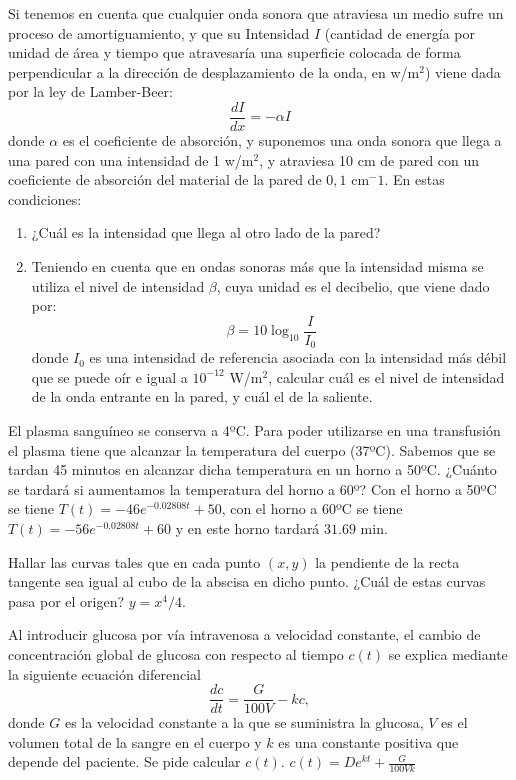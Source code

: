 {Si tenemos en cuenta que cualquier onda sonora que atraviesa un medio sufre un proceso de amortiguamiento, y que su
Intensidad $I$ (cantidad de energía por unidad de área y tiempo que atravesaría una superficie colocada de forma
perpendicular a la dirección de desplazamiento de la onda, en w/m$^2$) viene dada por la ley de Lamber-Beer:
\[
\frac{{dI}}{{dx}} =  - \alpha I
\]
donde $\alpha$ es el coeficiente de absorción, y suponemos una onda sonora que llega a una pared con una intensidad de 1 w/m$^2$, y atraviesa 10 cm de pared con un coeficiente de absorción del material de la pared de $0,1$ cm$^-1$. En estas condiciones:
\begin{enumerate}
\item ¿Cuál es la intensidad que llega al otro lado de la pared?
\item Teniendo en cuenta que en ondas sonoras más que la intensidad misma se utiliza el nivel de intensidad $\beta$, cuya unidad es el decibelio, que viene dado por:
\[
\beta  = 10\log _{10} \frac{I}{{I_0 }}
\]
donde $I_0$ es una intensidad de referencia asociada con la intensidad más débil que se puede oír e igual a $10^{-12}$ W/m$^2$, calcular cuál es el nivel de intensidad de la onda entrante en la pared, y cuál el de la saliente.
\end{enumerate}
}
{
}
{}


{El plasma sanguíneo se conserva a 4ºC. Para poder utilizarse en una transfusión el plasma tiene que alcanzar la
temperatura del cuerpo (37ºC). Sabemos que se tardan 45 minutos en alcanzar dicha temperatura en un horno a 50ºC.
¿Cuánto se tardará si aumentamos la temperatura del horno a 60º?}
{Con el horno a 50ºC se tiene $T(t)=-46e^{-0.02808t}+50$, con el horno a 60ºC se tiene $T(t)=-56e^{-0.02808t}+60$ y en
este horno tardará $31.69$ min.}
{}


{Hallar las curvas tales que en cada punto $(x,y)$ la pendiente de la recta tangente sea igual al cubo de la abscisa en
dicho punto. ¿Cuál de estas curvas pasa por el origen?}
{$y=x^4/4$.
}
{}


{Al introducir glucosa por vía intravenosa a velocidad constante, el cambio de concentración global de glucosa  con
respecto al tiempo $c(t)$ se explica mediante la siguiente ecuación diferencial 
\[
\frac{dc}{dt}=\frac{G}{100V}-kc,
\]
donde $G$ es la velocidad constante a la que se suministra la glucosa, $V$ es el volumen total de la sangre en el
cuerpo y $k$ es una constante positiva que depende del paciente. Se pide calcular $c(t)$.}
{$c(t)=De^{kt}+\frac{G}{100Vk}$
}
{}


